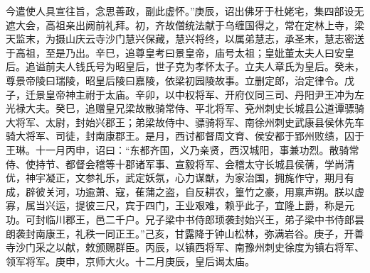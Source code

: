 \documentclass[]{article}
\begin{document}
今遣使人具宣往旨，念思善政，副此虚怀。''庚辰，诏出佛牙于杜姥宅，集四部设无遮大会，高祖亲出阙前礼拜。初，齐故僧统法献于乌缠国得之，常在定林上寺，梁天监末，为摄山庆云寺沙门慧兴保藏，慧兴将终，以属弟慧志，承圣末，慧志密送于高祖，至是乃出。辛巳，追尊皇考曰景皇帝，庙号太祖；皇妣董太夫人曰安皇后。追谥前夫人钱氏号为昭皇后，世子克为孝怀太子。立夫人章氏为皇后。癸未，尊景帝陵曰瑞陵，昭皇后陵曰嘉陵，依梁初园陵故事。立删定郎，治定律令。戊子，迁景皇帝神主祔于太庙。辛卯，以中权将军、开府仪同三司、丹阳尹王冲为左光禄大夫。癸巳，追赠皇兄梁故散骑常侍、平北将军、兗州刺史长城县公道谭骠骑大将军、太尉，封始兴郡王；弟梁故侍中、骠骑将军、南徐州刺史武康县侯休先车骑大将军、司徒，封南康郡王。是月，西讨都督周文育、侯安都于郢州败绩，囚于王琳。十一月丙申，诏曰：``东都齐国，义乃亲贤，西汉城阳，事兼功烈。散骑常侍、使持节、都督会稽等十郡诸军事、宣毅将军、会稽太守长城县侯蒨，学尚清优，神宇凝正，文参礼乐，武定妖氛，心力谋猷，为家治国，拥旄作守，期月有成，辟彼关河，功逾萧、寇，萑蒲之盗，自反耕农，篁竹之豪，用禀声朔。朕以虚寡，属当兴运，提彼三尺，宾于四门，王业艰难，赖乎此子，宜隆上爵，称是元功。可封临川郡王，邑二千户。兄子梁中书侍郎顼袭封始兴王，弟子梁中书侍郎昙朗袭封南康王，礼秩一同正王。''己亥，甘露降于钟山松林，弥满岩谷。庚子，开善寺沙门采之以献，敕颁赐群臣。丙辰，以镇西将军、南豫州刺史徐度为镇右将军、领军将军。庚申，京师大火。十二月庚辰，皇后谒太庙。
\end{document}

